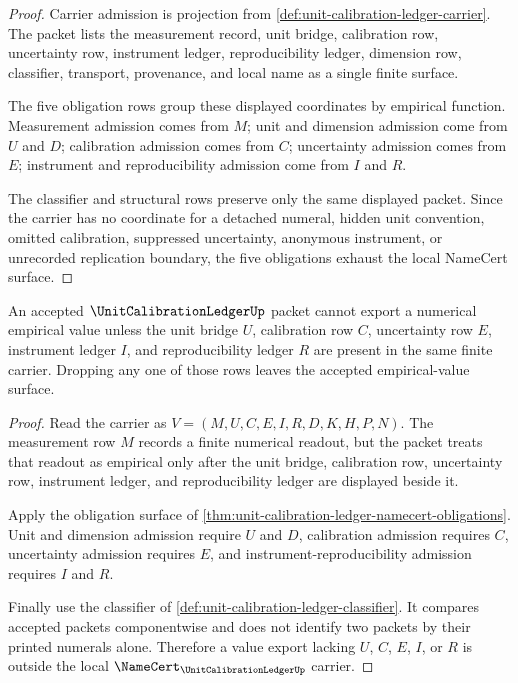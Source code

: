 \begin{proof}
Carrier admission is projection from \autoref{def:unit-calibration-ledger-carrier}. The packet lists the measurement record, unit bridge, calibration row, uncertainty row, instrument ledger, reproducibility ledger, dimension row, classifier, transport, provenance, and local name as a single finite surface.

The five obligation rows group these displayed coordinates by empirical function. Measurement admission comes from $M$; unit and dimension admission come from $U$ and $D$; calibration admission comes from $C$; uncertainty admission comes from $E$; instrument and reproducibility admission come from $I$ and $R$.

The classifier and structural rows preserve only the same displayed packet. Since the carrier has no coordinate for a detached numeral, hidden unit convention, omitted calibration, suppressed uncertainty, anonymous instrument, or unrecorded replication boundary, the five obligations exhaust the local NameCert surface.
\end{proof}

\begin{theorem}
\label{thm:unit-calibration-ledger-numeric-value-nonescape}
An accepted $\UnitCalibrationLedgerUp$ packet cannot export a numerical empirical value unless the unit bridge $U$, calibration row $C$, uncertainty row $E$, instrument ledger $I$, and reproducibility ledger $R$ are present in the same finite carrier. Dropping any one of those rows leaves the accepted empirical-value surface.
\end{theorem}
\begin{proof}
Read the carrier as $V=(M,U,C,E,I,R,D,K,H,P,N)$. The measurement row $M$ records a finite numerical readout, but the packet treats that readout as empirical only after the unit bridge, calibration row, uncertainty row, instrument ledger, and reproducibility ledger are displayed beside it.

Apply the obligation surface of \autoref{thm:unit-calibration-ledger-namecert-obligations}. Unit and dimension admission require $U$ and $D$, calibration admission requires $C$, uncertainty admission requires $E$, and instrument-reproducibility admission requires $I$ and $R$.

Finally use the classifier of \autoref{def:unit-calibration-ledger-classifier}. It compares accepted packets componentwise and does not identify two packets by their printed numerals alone. Therefore a value export lacking $U$, $C$, $E$, $I$, or $R$ is outside the local $\NameCert_{\UnitCalibrationLedgerUp}$ carrier.
\end{proof}

